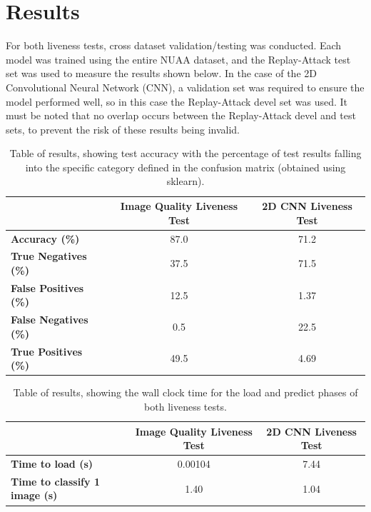 \documentclass[11pt,a4paper]{article}
\begin{document}
  
\section{Results}
    For both liveness tests, cross dataset validation/testing was conducted. Each model was trained using the entire NUAA dataset, and the Replay-Attack test set
    was used to measure the results shown below. In the case of the 2D Convolutional Neural Network (CNN), a validation set was required to ensure the model performed
    well, so in this case the Replay-Attack devel set was used. It must be noted that no overlap occurs between the Replay-Attack devel and test sets, to prevent the risk
    of these results being invalid.

    \begin{table}[ht]
        \centering
        \begin{tabular}[t]{lcc}
            \toprule
             & \textbf{Image Quality Liveness Test} & \textbf{2D CNN Liveness Test}\\
             \midrule
            \textbf{Accuracy (\%)} & 87.0 & 71.2\\
            \midrule
            \textbf{True Negatives (\%)} & 37.5 & 71.5\\
            \textbf{False Positives (\%)} & 12.5 & 1.37\\
            \textbf{False Negatives (\%)} & 0.5 & 22.5\\
            \textbf{True Positives (\%)} & 49.5 & 4.69\\
            \bottomrule
        \end{tabular}
        \caption{Table of results, showing test accuracy with the percentage of test results falling into the specific category defined in the confusion matrix (obtained using sklearn).}
        \label{ResultsTable}
    \end{table}

    \begin{table}[ht]
        \centering
        \begin{tabular}[t]{lcc}
            \toprule
             & \textbf{Image Quality Liveness Test} & \textbf{2D CNN Liveness Test}\\
             \midrule
            \textbf{Time to load (s)} & 0.00104 & 7.44\\
            \textbf{Time to classify 1 image (s)} & 1.40 & 1.04\\
            \bottomrule
        \end{tabular}
        \caption{Table of results, showing the wall clock time for the load and predict phases of both liveness tests.}
        \label{WallClockResultsTime}
    \end{table}
\end{document}
